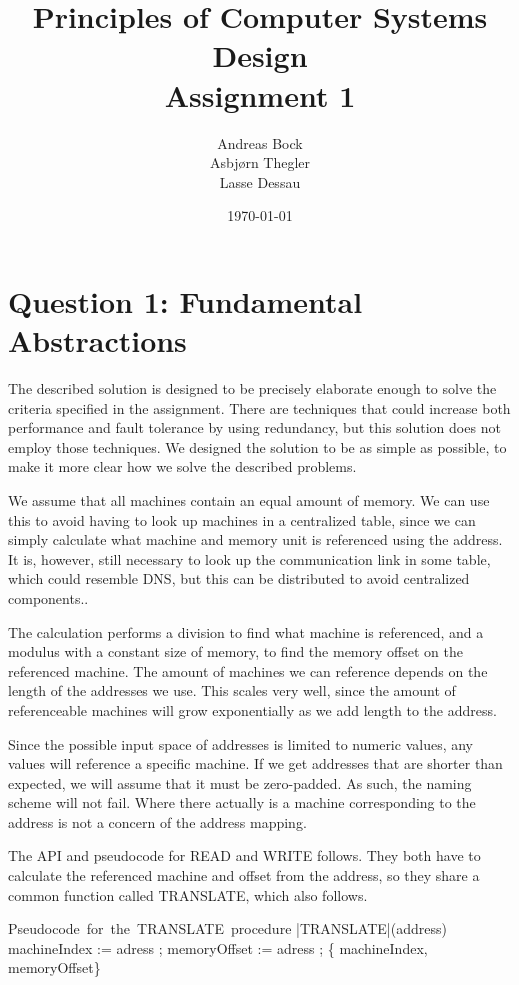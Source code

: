 \documentclass[11pt]{article}
\def\Author{Andreas Bock\\
Asbj\o rn Thegler\\
Lasse Dessau
}
\def\Title{\bf Principles of Computer Systems Design\\ {\Large Assignment 1}}
\begin{document}
\title{\Title}
\author{\Author}
\date{\today}
\maketitle

\section*{Question 1: Fundamental Abstractions}

The described solution is designed to be precisely elaborate enough to solve the
criteria specified in the assignment. There are techniques that could increase
both performance and fault tolerance by using redundancy, but this solution does
not employ those techniques. We designed the solution to be as simple as possible,
to make it more clear how we solve the described problems. 


We assume that all machines contain an equal amount of memory. We can use this
to avoid having to look up machines in a centralized table, since we can simply
calculate what machine and memory unit is referenced using the address. It is,
however, still necessary to look up the communication link in some table, which
could resemble DNS, but this can be distributed to avoid centralized components.. 

The calculation performs a division to find what machine is referenced, and
a modulus with a constant size of memory, to find the memory offset on the
referenced machine. The amount of machines we can reference depends on the
length of the addresses we use. This scales very well, since the amount of
referenceable machines will grow exponentially as we add length to the address.

Since the possible input space of addresses is limited to numeric values, any
values will reference a specific machine. If we get addresses that are shorter
than expected, we will assume that it must be zero-padded. As such, the naming
scheme will not fail. Where there actually is a machine corresponding to the
address is not a concern of the address mapping.



The API and pseudocode for READ and WRITE follows. They both have to calculate the referenced machine and offset from the address, so they share a common function called TRANSLATE, which also follows.

\begin{program}
\mbox{Pseudocode for the TRANSLATE procedure}
       \PROC |TRANSLATE|(address) \BODY
                 machineIndex := adress \;  \; ;
                 memoryOffset := adress \; \text{\%} \; ;
                  \; \{ machineIndex, memoryOffset\} \ENDPROC
\end{program}
\end{document}
